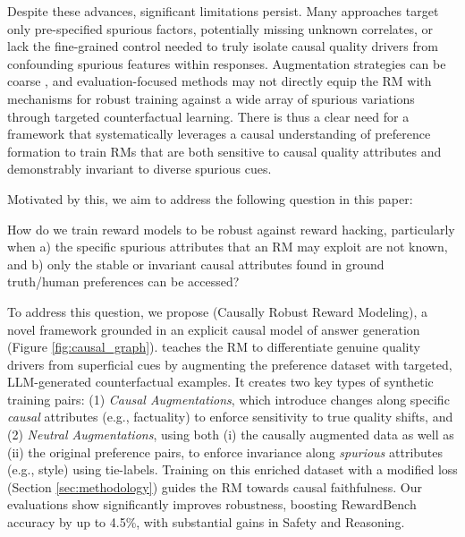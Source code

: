 \vspace{0.1in}
Despite these advances, significant limitations persist. Many approaches target only pre-specified spurious factors, potentially missing unknown correlates, or lack the fine-grained control needed to truly isolate causal quality drivers from confounding spurious features within responses. Augmentation strategies can be coarse \citep{liu2024rrm}, and evaluation-focused methods \citep{gupta2025carmodynamiccriteriageneration, reber2024rate} may not directly equip the RM with mechanisms for robust training against a wide array of spurious variations through targeted counterfactual learning. There is thus a clear need for a framework that systematically leverages a causal understanding of preference formation to train RMs that are both sensitive to causal quality attributes and demonstrably invariant to diverse spurious cues.

\vspace{0.1in}
Motivated by this, we aim to address the following question in this paper:

\vspace{0.1in}
\begin{takeawaybox}
    How do we train reward models to be robust against reward hacking, particularly when a) the specific spurious attributes that an RM may exploit are not known, and b) only the stable or invariant causal attributes found in ground truth/human preferences can be accessed?
\end{takeawaybox}
\vspace{0.1in}

To address this question, we propose \textbf{\carma{}} (Causally Robust Reward Modeling), a novel framework grounded in an explicit causal model of answer generation (Figure \ref{fig:causal_graph}). \carma{} teaches the RM to differentiate genuine quality drivers from superficial cues by augmenting the preference dataset with targeted, LLM-generated counterfactual examples. It creates two key types of synthetic training pairs: (1) \textit{Causal Augmentations}, which introduce changes along specific \textit{causal} attributes (e.g., factuality) to enforce sensitivity to true quality shifts, and (2) \textit{Neutral Augmentations}, using both (i) the causally augmented data as well as (ii) the original preference pairs,
to enforce invariance along \textit{spurious} attributes (e.g., style) using tie-labels. 
Training on this enriched dataset with a modified loss (Section \ref{sec:methodology}) guides the RM towards causal faithfulness. Our evaluations show \carma{} significantly improves robustness, boosting RewardBench accuracy by up to 4.5\%, with substantial gains in Safety and Reasoning.


